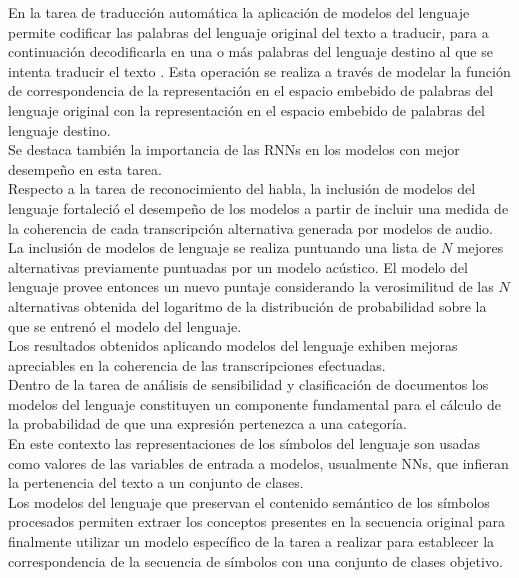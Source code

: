 \documentclass{article}
\begin{document}
	En la tarea de traducción automática la aplicación de modelos del lenguaje permite codificar las palabras del lenguaje original del texto a traducir, para a continuación decodificarla en una o más palabras del lenguaje destino al que se intenta traducir el texto \cite{51SequenceToSequenceMachineTranslation, 52MachineTranslationAttentionRNN}. Esta operación se realiza a través de modelar la función de correspondencia de la representación en el espacio embebido de palabras del lenguaje original con la representación en el espacio embebido de palabras del lenguaje destino.\\
	Se destaca también la importancia de las RNNs en los modelos con mejor desempeño en esta tarea.\\
	
	Respecto a la tarea de reconocimiento del habla, la inclusión de modelos del lenguaje fortaleció el desempeño de los modelos a partir de incluir una medida de la coherencia de cada transcripción alternativa generada por modelos de audio\cite{54SpeechRecognitionLMLatticeScoring, 55WordEmbeddingsRescoringSpeechRecognition, 56MicrosoftSpeechRecognition}.\\
	La inclusión de modelos de lenguaje se realiza puntuando una lista de $N$ mejores alternativas previamente puntuadas por un modelo acústico. El modelo del lenguaje provee entonces un nuevo puntaje considerando la verosimilitud de las $N$ alternativas obtenida del logaritmo de la distribución de probabilidad sobre la que se entrenó el modelo del lenguaje.\\
	Los resultados obtenidos aplicando modelos del lenguaje exhiben mejoras apreciables en la coherencia de las transcripciones efectuadas.\\
	
	Dentro de la tarea de análisis de sensibilidad y clasificación de documentos los modelos del lenguaje constituyen un componente fundamental para el cálculo de la probabilidad de que una expresión pertenezca a una categoría.\\
	En este contexto las representaciones de los símbolos del lenguaje son usadas como valores de las variables de entrada a modelos, usualmente NNs, que infieran la pertenencia del texto a un conjunto de clases.\\
	Los modelos del lenguaje que preservan el contenido semántico de los símbolos procesados permiten extraer los conceptos presentes en la secuencia original para finalmente utilizar un modelo específico de la tarea a realizar para establecer la correspondencia de la secuencia de símbolos con una conjunto de clases objetivo\cite{57SentimentAnalysisLanguageModels}.\\
	
\end{document}
